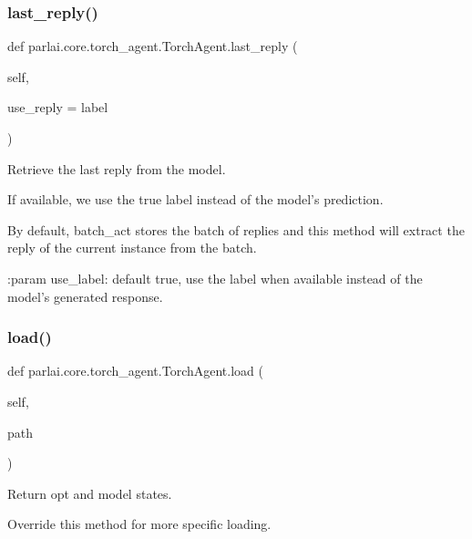 \subsubsection{\texorpdfstring{last\+\_\+reply()}{last\_reply()}}
{\footnotesize\ttfamily def parlai.\+core.\+torch\+\_\+agent.\+Torch\+Agent.\+last\+\_\+reply (\begin{DoxyParamCaption}\item[{}]{self,  }\item[{}]{use\+\_\+reply = {\ttfamily \textquotesingle{}label\textquotesingle{}} }\end{DoxyParamCaption})}

\begin{DoxyVerb}Retrieve the last reply from the model.

If available, we use the true label instead of the model's prediction.

By default, batch_act stores the batch of replies and this method
will extract the reply of the current instance from the batch.

:param use_label:
    default true, use the label when available instead of the model's
    generated response.
\end{DoxyVerb}
 \mbox{\label{classparlai_1_1core_1_1torch__agent_1_1TorchAgent_af626fc7d32fc9b0dfeec167a52353baf}} 
\subsubsection{\texorpdfstring{load()}{load()}}
{\footnotesize\ttfamily def parlai.\+core.\+torch\+\_\+agent.\+Torch\+Agent.\+load (\begin{DoxyParamCaption}\item[{}]{self,  }\item[{}]{path }\end{DoxyParamCaption})}

\begin{DoxyVerb}Return opt and model states.

Override this method for more specific loading.
\end{DoxyVerb}
 \mbox{\label{classparlai_1_1core_1_1torch__agent_1_1TorchAgent_a5dcfca62a677f8de97f09ce993258f84}} 
